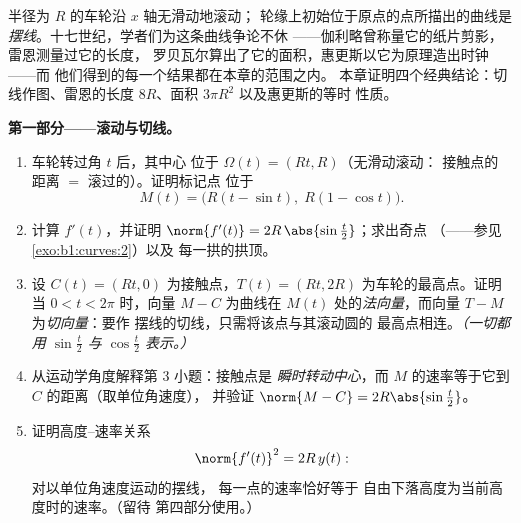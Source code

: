 \begin{problem}\label{pb:b1:curves:1}
半径为 $R$ 的车轮沿 $x$ 轴无滑动地滚动；
轮缘上初始位于原点的点所描出的曲线是
\emph{摆线}。十七世纪，学者们为这条曲线争论不休
——伽利略曾称量它的纸片剪影，雷恩测量过它的长度，
罗贝瓦尔算出了它的面积，惠更斯以它为原理造出时钟——而
他们得到的每一个结果都在本章的范围之内。
本章证明四个经典结论：切线作图、雷恩的长度
$8R$、面积 $3\pi R^2$ 以及惠更斯的等时
性质。

\medskip
\noindent\textbf{第一部分——滚动与切线。}
\begin{enumerate}
  \item 车轮转过角 $t$ 后，其中心
        位于 $\Omega(t) = (Rt, R)$（无滑动滚动：
        接触点的距离 $=$ 滚过的）。证明标记点
        位于
        \[
        M(t) = \bigl(R(t - \sin t),\; R(1 - \cos t)\bigr).
        \]
  \item 计算 $f'(t)$，并证明 $\norm{f'(t)} =
        2R\,\abs{\sin\frac t2}$；求出奇点
        （——参见\cref{exo:b1:curves:2}）以及
        每一拱的拱顶。
  \item 设 $C(t) = (Rt, 0)$ 为接触点，$T(t) =
        (Rt, 2R)$ 为车轮的最高点。证明当 $0 < t <
        2\pi$ 时，向量 $M - C$ 为曲线在
        $M(t)$ 处的\emph{法向量}，而向量 $T - M$ 为\emph{切向量}：要作
        摆线的切线，只需将该点与其滚动圆的
        最高点相连。\emph{（一切都用
        $\sin\frac t2$ 与 $\cos\frac t2$ 表示。）}
  \item 从运动学角度解释第 3 小题：接触点是
        \emph{瞬时转动中心}，而
        $M$ 的速率等于它到 $C$ 的距离（取单位角速度），
        并验证 $\norm{M - C} = 2R\abs{\sin\frac t2}$。
  \item 证明高度--速率关系
        \[
        \norm{f'(t)}^2 = 2R\,y(t) :
        \]
        对以单位角速度运动的摆线，
        每一点的速率恰好等于
        自由下落高度为当前高度时的速率。（留待
        第四部分使用。）
\end{enumerate}


\end{problem}
